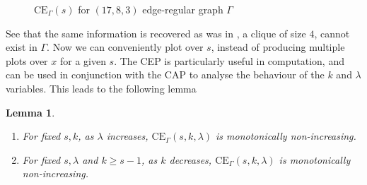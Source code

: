 \documentclass[11pt, baustms]{amsproc}
\theoremstyle{scplain}
\newtheorem{lemma}[theorem]{Lemma}
\newcommand\CE{\mathrm{CE}}
\renewcommand\ge{\geqslant}
\begin{document}
    	\begin{figure}[!ht]
\caption{$\CE_\Gamma(s)$ for $(17,8,3)$ edge-regular graph $\Gamma$}
\end{figure}

See that the same information is recovered as was in , a clique of size $4$, cannot exist in $\Gamma$. Now we can conveniently plot over $s$, instead of producing multiple plots over $x$ for a given $s$. The CEP is particularly useful in computation, and can be used in conjunction with the CAP to analyse the behaviour of the $k$ and $\lambda$ variables. This leads to the following lemma


    \begin{lemma}
	\label{props}
    \leavevmode
	\begin{enumerate}
    \item For fixed $s, k$, as $\lambda$ increases, $\CE_\Gamma(s,k,\lambda)$ is monotonically non-increasing.
	\item For fixed $s, \lambda$ and $k\ge s-1$, as $k$ decreases, $\CE_\Gamma(s,k,\lambda)$ is monotonically non-increasing. 
	\end{enumerate}
	\end{lemma}
\end{document}
